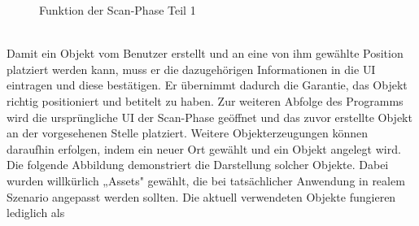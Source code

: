 \begin{figure}[hbt!]
    \centering
    \caption{Funktion der Scan-Phase Teil 1}
    \label{pic:markerTracking}
\end{figure} 
\\ 
Damit ein Objekt vom Benutzer erstellt und an eine von ihm gewählte Position platziert werden kann, muss er die dazugehörigen Informationen in die \acs{UI} 
eintragen und diese bestätigen. Er übernimmt dadurch die Garantie, das Objekt richtig positioniert und betitelt zu haben. Zur weiteren Abfolge des Programms 
wird die ursprüngliche \acs{UI} der Scan-Phase geöffnet und das zuvor erstellte Objekt an der vorgesehenen Stelle platziert. 
Weitere Objekterzeugungen können daraufhin erfolgen, indem ein neuer Ort gewählt und ein Objekt angelegt wird. Die folgende Abbildung demonstriert die 
Darstellung solcher Objekte. Dabei wurden willkürlich 
„Assets" gewählt, die bei tatsächlicher Anwendung in realem Szenario angepasst werden sollten. Die aktuell verwendeten Objekte fungieren lediglich als 

